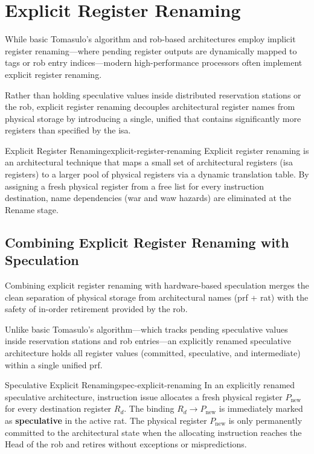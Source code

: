 \section{Explicit Register Renaming}
\label{sec:explicit_register_renaming}

While basic Tomasulo's algorithm and \gls{rob}-based architectures employ implicit register renaming—where pending register outputs are dynamically mapped to  tags or \gls{rob} entry indices—modern high-performance processors often implement explicit register renaming. 

Rather than holding speculative values inside distributed reservation stations or the \gls{rob}, explicit register renaming decouples architectural register names from physical storage by introducing a single, unified  that contains significantly more registers than specified by the \gls{isa}.

\begin{definition}{Explicit Register Renaming}{explicit-register-renaming}
    Explicit register renaming is an architectural technique that maps a small set of architectural registers (\gls{isa} registers) to a larger pool of physical registers via a dynamic translation table. By assigning a fresh physical register from a free list for every instruction destination, name dependencies (\gls{war} and \gls{waw} hazards) are eliminated at the Rename stage.
\end{definition}

\subsection{Combining Explicit Register Renaming with Speculation}
\label{subsec:explicit_renaming_speculation}

Combining explicit register renaming with hardware-based speculation merges the clean separation of physical storage from architectural names (\gls{prf} + \gls{rat}) with the safety of in-order retirement provided by the \gls{rob}. 

Unlike basic Tomasulo's algorithm—which tracks pending speculative values inside reservation stations and \gls{rob} entries—an explicitly renamed speculative architecture holds all register values (committed, speculative, and intermediate) within a single unified \gls{prf}.

\begin{definition}{Speculative Explicit Renaming}{spec-explicit-renaming}
    In an explicitly renamed speculative architecture, instruction issue allocates a fresh physical register $P_{\text{new}}$ for every destination register $R_d$. The binding $R_d \to P_{\text{new}}$ is immediately marked as \textbf{speculative} in the active \gls{rat}. The physical register $P_{\text{new}}$ is only permanently committed to the architectural state when the allocating instruction reaches the Head of the \gls{rob} and retires without exceptions or mispredictions.
\end{definition}


